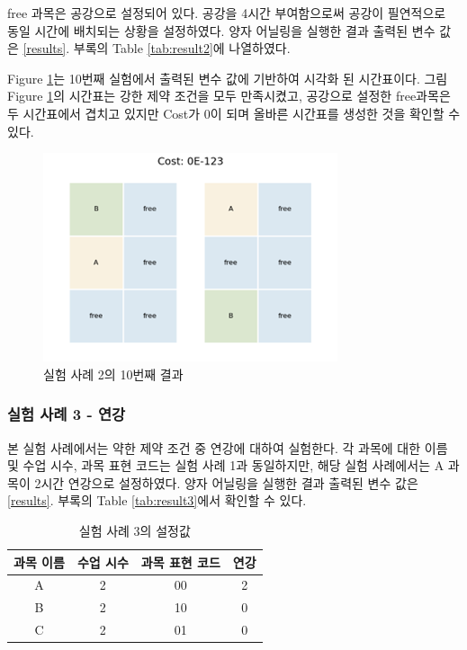 \documentclass[12pt,a4paper]{article}
\begin{document}
    free 과목은 공강으로 설정되어 있다. 공강을 4시간 부여함으로써 공강이 필연적으로 동일 시간에 배치되는 상황을 설정하였다. 양자 어닐링을 실행한 결과 출력된 변수 값은 \ref{results}. 부록의 Table \ref{tab:result2}에 나열하였다.

    Figure \ref{fig:case2}는 10번째 실험에서 출력된 변수 값에 기반하여 시각화 된 시간표이다. 그림 Figure \ref{fig:case2}의 시간표는 강한 제약 조건을 모두 만족시켰고, 공강으로 설정한 free과목은 두 시간표에서 겹치고 있지만 Cost가 0이 되며 올바른 시간표를 생성한 것을 확인할 수 있다.

    \begin{figure}[htb!]
        \centering
        \includegraphics[width=\textwidth]{Case2.png}
        \caption{실험 사례 2의 10번째 결과}
        \label{fig:case2}
    \end{figure}

    \subsubsection{실험 사례 3 - 연강}

    본 실험 사례에서는 약한 제약 조건 중 연강에 대하여 실험한다. 각 과목에 대한 이름 및 수업 시수, 과목 표현 코드는 실험 사례 1과 동일하지만, 해당 실험 사례에서는 A 과목이 2시간 연강으로 설정하였다. 양자 어닐링을 실행한 결과 출력된 변수 값은 \ref{results}. 부록의 Table \ref{tab:result3}에서 확인할 수 있다.

    \begin{table}[htb!]
        \centering
        \begin{tabular}{c c c c}
             \hline
             과목 이름 & 수업 시수 & 과목 표현 코드 & 연강\\
             \hline
             A & 2 & 00 & 2\\
             B & 2 & 10 & 0\\
             C & 2 & 01 & 0\\
             \hline
        \end{tabular}
        \caption{실험 사례 3의 설정값}\label{tab:testcase3}
    \end{table}
\end{document}
